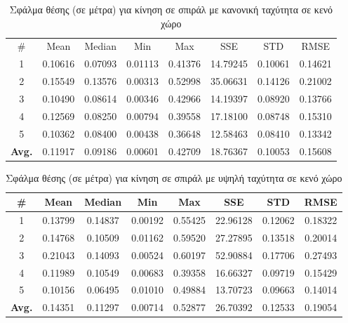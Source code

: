 \begin{table}[H]
    \begin{center}
        \centering
        \caption{Σφάλμα θέσης (σε μέτρα) για κίνηση σε σπιράλ με κανονική ταχύτητα σε κενό χώρο}
        \label{tab:position_error_spiral_normal_box}
        \begin{tabular}{| c | c | c | c | c | c | c | c | }
        \hline
        \rowcolor{Gray}
        \# & Mean & Median & Min & Max & SSE & STD & RMSE \\
        1 & 0.10616 & 0.07093 & 0.01113 & 0.41376 & 14.79245 & 0.10061 & 0.14621 \\
        2 & 0.15549 & 0.13576 & 0.00313 & 0.52998 & 35.06631 & 0.14126 & 0.21002 \\
        3 & 0.10490 & 0.08614 & 0.00346 & 0.42966 & 14.19397 & 0.08920 & 0.13766 \\
        4 & 0.12569 & 0.08250 & 0.00794 & 0.39558 & 17.18100 & 0.08748 & 0.15310 \\
        5 & 0.10362 & 0.08400 & 0.00438 & 0.36648 & 12.58463 & 0.08410 & 0.13342 \\
        \hline
        \textbf{Avg.} & 0.11917 & 0.09186 & 0.00601 & 0.42709 & 18.76367 & 0.10053 & 0.15608 \\
        \hline
        \end{tabular}
    \end{center}
\end{table}

\begin{table}[H]
    \begin{center}
        \centering
        \caption{Σφάλμα θέσης (σε μέτρα) για κίνηση σε σπιράλ με υψηλή ταχύτητα σε κενό χώρο}
        \label{tab:position_error_spiral_fast_box}
        \begin{tabular}{| c | c | c | c | c | c | c | c | }
        \hline
        \rowcolor{Gray}
        \# & Mean & Median & Min & Max & SSE & STD & RMSE \\
        \hline
        1 & 0.13799 & 0.14837 & 0.00192 & 0.55425 & 22.96128 & 0.12062 & 0.18322 \\
        2 & 0.14768 & 0.10509 & 0.01162 & 0.59520 & 27.27895 & 0.13518 & 0.20014 \\
        3 & 0.21043 & 0.14093 & 0.00524 & 0.60197 & 52.90884 & 0.17706 & 0.27493 \\
        4 & 0.11989 & 0.10549 & 0.00683 & 0.39358 & 16.66327 & 0.09719 & 0.15429 \\
        5 & 0.10156 & 0.06495 & 0.01010 & 0.49884 & 13.70723 & 0.09663 & 0.14014 \\
        \hline
        \textbf{Avg.} & 0.14351 & 0.11297 & 0.00714 & 0.52877 & 26.70392 & 0.12533 & 0.19054 \\
        \hline
        \end{tabular}
    \end{center}
\end{table}

